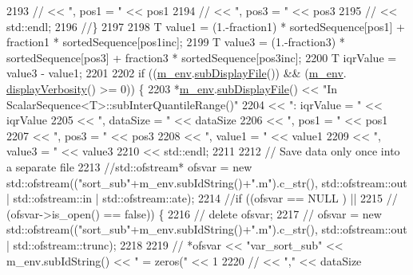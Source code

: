 \begin{DoxyCode}
2193   \textcolor{comment}{//                          << ", pos1 = "                     << pos1}
2194   \textcolor{comment}{//                          << ", pos3 = "                     << pos3}
2195   \textcolor{comment}{//                          << std::endl;}
2196   \textcolor{comment}{//\}}
2197 
2198   T value1 = (1.-fraction1) * sortedSequence[pos1] + fraction1 * sortedSequence[pos1inc];
2199   T value3 = (1.-fraction3) * sortedSequence[pos3] + fraction3 * sortedSequence[pos3inc];
2200   T iqrValue = value3 - value1;
2201 
2202   \textcolor{keywordflow}{if} ((\hyperlink{class_q_u_e_s_o_1_1_scalar_sequence_a71618cd6351b29361b437af68447a4c8}{m\_env}.\hyperlink{class_q_u_e_s_o_1_1_base_environment_a8a0064746ae8dddfece4229b9ad374d6}{subDisplayFile}()) && (\hyperlink{class_q_u_e_s_o_1_1_scalar_sequence_a71618cd6351b29361b437af68447a4c8}{m\_env}.
      \hyperlink{class_q_u_e_s_o_1_1_base_environment_a1fe5f244fc0316a0ab3e37463f108b96}{displayVerbosity}() >= 0)) \{
2203     *\hyperlink{class_q_u_e_s_o_1_1_scalar_sequence_a71618cd6351b29361b437af68447a4c8}{m\_env}.\hyperlink{class_q_u_e_s_o_1_1_base_environment_a8a0064746ae8dddfece4229b9ad374d6}{subDisplayFile}() << \textcolor{stringliteral}{"In ScalarSequence<T>::subInterQuantileRange()"}
2204                             << \textcolor{stringliteral}{": iqrValue = "} << iqrValue
2205                             << \textcolor{stringliteral}{", dataSize = "} << dataSize
2206                             << \textcolor{stringliteral}{", pos1 = "}     << pos1
2207                             << \textcolor{stringliteral}{", pos3 = "}     << pos3
2208                             << \textcolor{stringliteral}{", value1 = "}   << value1
2209                             << \textcolor{stringliteral}{", value3 = "}   << value3
2210                             << std::endl;
2211 
2212     \textcolor{comment}{// Save data only once into a separate file}
2213     \textcolor{comment}{//std::ofstream* ofsvar = new std::ofstream(("sort\_sub"+m\_env.subIdString()+".m").c\_str(),
       std::ofstream::out | std::ofstream::in | std::ofstream::ate);}
2214     \textcolor{comment}{//if ((ofsvar            == NULL ) ||}
2215     \textcolor{comment}{//    (ofsvar->is\_open() == false)) \{}
2216     \textcolor{comment}{//  delete ofsvar;}
2217     \textcolor{comment}{//  ofsvar = new std::ofstream(("sort\_sub"+m\_env.subIdString()+".m").c\_str(), std::ofstream::out |
       std::ofstream::trunc);}
2218 
2219     \textcolor{comment}{//  *ofsvar << "var\_sort\_sub" << m\_env.subIdString() << " = zeros(" << 1}
2220     \textcolor{comment}{//          << ","                                                  << dataSize}

\end{DoxyCode}
